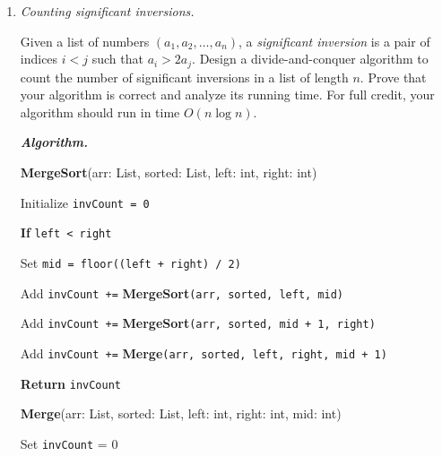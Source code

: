 \documentclass[11pt]{article}
\newcounter{totalpoints}
\newcommand{\points}[1]{\addtocounter{totalpoints}{#1}{[#1 point\ifthenelse{\equal{#1}{1}}{}{s}]}}
\begin{document}
\begin{enumerate}[leftmargin=*,start=0]
\hfill

\textit{\textbf{Time Complexity}}. Sorting is $\mathcal{O}(n\log n)$, then iterating through the jobs 
and for each iteration, potentially updating \verb|free| is worst case $\mathcal{O}(n^2)$. Therefore, the overall time complexity 
of this algorithm is $\mathcal{O}(n^2)$.

\hfill

\newpage

\item\emph{Counting significant inversions.} \points{20}

Given a list of numbers $(a_1,a_2,\ldots,a_n)$, a \emph{significant inversion} is a pair of indices $i<j$ such that $a_i>2a_j$.  Design a divide-and-conquer algorithm to count the number of significant inversions in a list of length $n$.  Prove that your algorithm is correct and analyze its running time.  For full credit, your algorithm should run in time $O(n \log n)$.

\hfill

\textbf{\textit{Algorithm.}}

\textbf{MergeSort}(arr: List, sorted: List, left: int, right: int)

\hspace{5mm} Initialize \verb|invCount = 0|

\hspace{5mm} \textbf{If} \verb|left < right|

\hspace{10mm} Set \verb|mid = floor((left + right) / 2)|

\hspace{10mm} Add \verb|invCount +=| \textbf{MergeSort}\verb|(arr, sorted, left, mid)|

\hspace{10mm} Add \verb|invCount +=| \textbf{MergeSort}\verb|(arr, sorted, mid + 1, right)|

\hspace{10mm} Add \verb|invCount +=| \textbf{Merge}\verb|(arr, sorted, left, right, mid + 1)|

\hspace{5mm} \textbf{Return} \verb|invCount|

\hfill

\textbf{Merge}(arr: List, sorted: List, left: int, right: int, mid: int)

\hspace{5mm} Set \verb|invCount| = 0


\end{enumerate}
\end{document}
